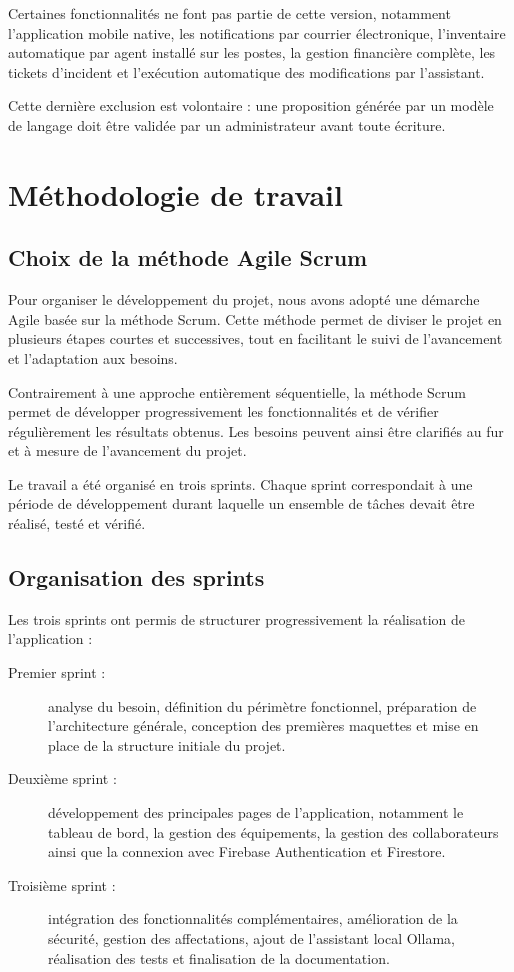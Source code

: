 \documentclass{rapportENSIAS}
\begin{document}
Certaines fonctionnalités ne font pas partie de cette version, notamment l’application mobile native, les notifications par courrier électronique, l’inventaire automatique par agent installé sur les postes, la gestion financière complète, les tickets d’incident et l’exécution automatique des modifications par l’assistant.

Cette dernière exclusion est volontaire : une proposition générée par un modèle de langage doit être validée par un administrateur avant toute écriture.

\section{Méthodologie de travail}

\subsection{Choix de la méthode Agile Scrum}

Pour organiser le développement du projet, nous avons adopté une démarche Agile basée sur la méthode Scrum. Cette méthode permet de diviser le projet en plusieurs étapes courtes et successives, tout en facilitant le suivi de l’avancement et l’adaptation aux besoins.

Contrairement à une approche entièrement séquentielle, la méthode Scrum permet de développer progressivement les fonctionnalités et de vérifier régulièrement les résultats obtenus. Les besoins peuvent ainsi être clarifiés au fur et à mesure de l’avancement du projet.

Le travail a été organisé en trois sprints. Chaque sprint correspondait à une période de développement durant laquelle un ensemble de tâches devait être réalisé, testé et vérifié.

\subsection{Organisation des sprints}

Les trois sprints ont permis de structurer progressivement la réalisation de l’application :

\begin{description}
\item[Premier sprint :] analyse du besoin, définition du périmètre fonctionnel, préparation de l’architecture générale, conception des premières maquettes et mise en place de la structure initiale du projet.

\item[Deuxième sprint :] développement des principales pages de l’application, notamment le tableau de bord, la gestion des équipements, la gestion des collaborateurs ainsi que la connexion avec Firebase Authentication et Firestore.

\item[Troisième sprint :] intégration des fonctionnalités complémentaires, amélioration de la sécurité, gestion des affectations, ajout de l’assistant local Ollama, réalisation des tests et finalisation de la documentation.
\end{description}
\end{document}
